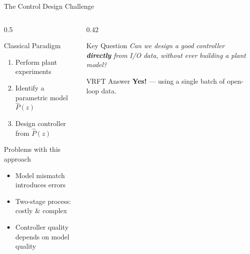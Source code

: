 \documentclass[hyperref={pdfpagemode=FullScreen},aspectratio=169]{beamer}
\newcommand{\highlight}[1]{{\color{accentgreen!70!black}\textbf{#1}}}
\begin{document}
\begin{frame}{The Control Design Challenge}
  \begin{columns}[T]
    \begin{column}{0.5\textwidth}
      \begin{block}{Classical Paradigm}
        \begin{enumerate}
          \item Perform plant experiments
          \item Identify a parametric model $\hat{P}(z)$
          \item Design controller from $\hat{P}(z)$
        \end{enumerate}
      \end{block}
      \vspace{0.4em}
      \begin{alertblock}{Problems with this approach}
        \begin{itemize}
          \item Model mismatch introduces errors
          \item Two-stage process: costly \& complex
          \item Controller quality depends on model quality
        \end{itemize}
      \end{alertblock}
    \end{column}
    \begin{column}{0.42\textwidth}
      \begin{block}{Key Question}
        \centering\vspace{0.3em}
        \textit{Can we design a good controller \textbf{directly} from I/O data, without ever building a plant model?}
        \vspace{0.3em}
      \end{block}
      \vspace{0.4em}
      \begin{exampleblock}{VRFT Answer}
        \centering\vspace{0.2em}
        \highlight{Yes!} --- using a single batch of open-loop data.
        \vspace{0.2em}
      \end{exampleblock}
    \end{column}
  \end{columns}
\end{frame}
\end{document}
